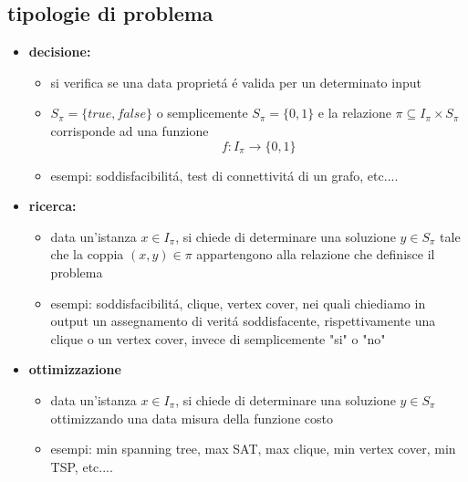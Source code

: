 \subsection*{tipologie di problema}
\begin{itemize}
	\item \textbf{decisione:}
		\begin{itemize}
			\item si verifica se una data propriet\'a \'e valida per un determinato input
			\item $S_{\pi}=\{true,false\}$ o semplicemente $S_{\pi}=\{0,1\}$ e la relazione $\pi\subseteq I_{\pi}\times S_{\pi}$ corrisponde ad una funzione $$f:I_{\pi}\rightarrow\{0,1\}$$ 
			\item esempi: soddisfacibilit\'a, test di connettivit\'a di un grafo, etc....
		\end{itemize}
	\item \textbf{ricerca:}
	\begin{itemize}
		\item data un'istanza $x\in I_{\pi}$, si chiede di determinare una soluzione $y\in S_{\pi}$ tale che la coppia $(x,y)\in\pi$ appartengono alla relazione che definisce il problema
		\item esempi: soddisfacibilit\'a, clique, vertex cover, nei quali chiediamo in output un assegnamento di verit\'a soddisfacente, rispettivamente una clique o un vertex cover, invece di semplicemente "si" o "no"
	\end{itemize}
	\item \textbf{ottimizzazione}
	\begin{itemize}
		\item data un'istanza $x\in I_{\pi}$, si chiede di determinare una soluzione $y\in S_{\pi}$ ottimizzando una data misura della funzione costo
		\item esempi: min spanning tree, max SAT, max clique, min vertex cover, min TSP, etc....
	\end{itemize}
\end{itemize}


